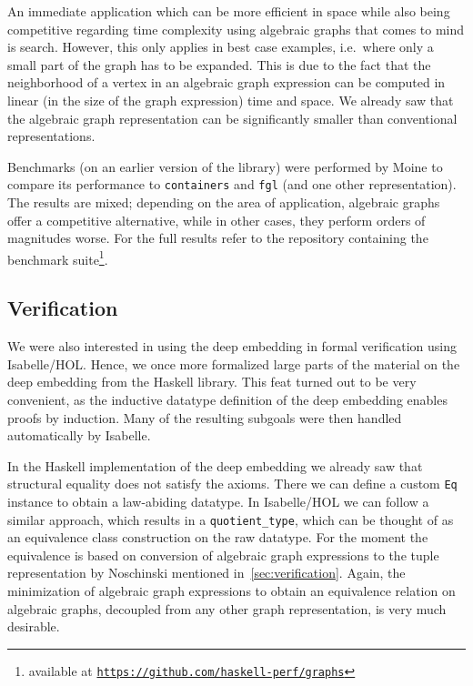 \documentclass{article}
\newcommand{\hs}{\texttt}
\begin{document}
An immediate application which can be more efficient in space while also being
competitive regarding time complexity using
algebraic graphs that comes to mind is search. However, this only applies in best case
examples, i.e.\ where only a small part of the graph has to be expanded. This is
due to the fact that the neighborhood of a vertex in an algebraic graph
expression can be computed in linear (in the size of the graph expression) time
and space. We already saw that the algebraic graph representation can be
significantly smaller than conventional representations.

Benchmarks (on an earlier version of the library) were performed by Moine to compare
its performance to \texttt{containers} and \texttt{fgl} (and one other
representation). The results are mixed; depending on the area of application,
algebraic graphs offer a competitive alternative, while in other cases, they
perform orders of magnitudes worse. For the full results refer to the repository
containing the benchmark suite\footnote{available at
  \texttt{\href{https://github.com/haskell-perf/graphs}{https://github.com/haskell-perf/graphs}}}.

\subsection{Verification}\label{sec:quotient}
We were also interested in using the deep embedding in formal verification using
Isabelle/HOL. Hence, we once more formalized large parts of the material on the
deep embedding from the Haskell library. This
feat turned out to be very convenient, as the inductive datatype definition of the deep
embedding enables proofs by induction. Many of the resulting subgoals were then handled
automatically by Isabelle.

In the Haskell implementation of the deep embedding we already saw that
structural equality does not satisfy the axioms. There we can define a custom
\hs{Eq} instance to obtain a law-abiding datatype. In Isabelle/HOL we can follow
a similar approach, which results in a \texttt{quotient\_type}, which can be
thought of as an equivalence class construction on the raw datatype. For the
moment the equivalence is based on conversion of algebraic graph expressions to
the tuple representation by Noschinski mentioned in~\autoref{sec:verification}.
Again, the minimization of algebraic graph expressions to obtain an equivalence
relation on algebraic graphs, decoupled from any other graph representation, is
very much desirable.
\end{document}
